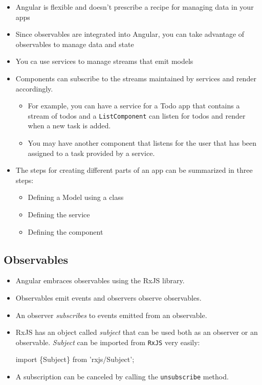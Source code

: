 \documentclass[12pt,]{article}
\newenvironment{Shaded}{}{}
\newcommand{\KeywordTok}[1]{\textcolor[rgb]{0.00,0.00,1.00}{{#1}}}
\providecommand{\tightlist}{%
  \setlength{\itemsep}{0pt}\setlength{\parskip}{0pt}}
\begin{document}
\begin{itemize}
\tightlist
\item
  Angular is flexible and doesn't prescribe a recipe for managing data
  in your apps
\item
  Since observables are integrated into Angular, you can take advantage
  of observables to manage data and state
\item
  You ca use services to manage streams that emit models
\item
  Components can subscribe to the streams maintained by services and
  render accordingly.

  \begin{itemize}
  \tightlist
  \item
    For example, you can have a service for a Todo app that contains a
    stream of todos and a \texttt{ListComponent} can listen for todos
    and render when a new task is added.
  \item
    You may have another component that listens for the user that has
    been assigned to a task provided by a service.
  \end{itemize}
\item
  The steps for creating different parts of an app can be summarized in
  three steps:

  \begin{itemize}
  \tightlist
  \item
    Defining a Model using a class
  \item
    Defining the service
  \item
    Defining the component
  \end{itemize}
\end{itemize}

\subsection{Observables}\label{observables}

\begin{itemize}
\item
  Angular embraces observables using the RxJS library.
\item
  Observables emit events and observers observe observables.
\item
  An observer \emph{subscribes} to events emitted from an observable.
\item
  RxJS has an object called \emph{subject} that can be used both as an
  observer or an observable. \emph{Subject} can be imported from
  \texttt{RxJS} very easily:

\begin{Shaded}
\begin{Highlighting}[numbers=left,,]
\KeywordTok{import \{Subject\} from 'rxjs/Subject';}
\end{Highlighting}
\end{Shaded}
\item
  A subscription can be canceled by calling the \texttt{unsubscribe}
  method.
\end{itemize}
\end{document}
